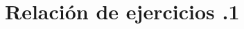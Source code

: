 

\newpage
\thispagestyle{empty}

\ 

\vfill
\newpage


\section*{Relación de ejercicios \thechapter.1}

\pagestyle{relaciones}

